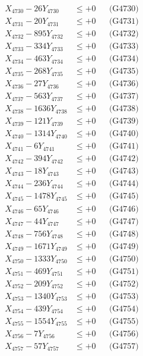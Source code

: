 \documentclass[a4paper,10pt]{article}
\begin{document}
{\begin{align}
X_{4730} - 26Y_{4730} &\leq +0 && \text{(G4730)} \\
\allowbreak
X_{4731} - 20Y_{4731} &\leq +0 && \text{(G4731)} \\
X_{4732} - 895Y_{4732} &\leq +0 && \text{(G4732)} \\
X_{4733} - 334Y_{4733} &\leq +0 && \text{(G4733)} \\
X_{4734} - 463Y_{4734} &\leq +0 && \text{(G4734)} \\
X_{4735} - 268Y_{4735} &\leq +0 && \text{(G4735)} \\
X_{4736} - 27Y_{4736} &\leq +0 && \text{(G4736)} \\
X_{4737} - 563Y_{4737} &\leq +0 && \text{(G4737)} \\
X_{4738} - 1636Y_{4738} &\leq +0 && \text{(G4738)} \\
X_{4739} - 121Y_{4739} &\leq +0 && \text{(G4739)} \\
X_{4740} - 1314Y_{4740} &\leq +0 && \text{(G4740)} \\
\allowbreak
X_{4741} - 6Y_{4741} &\leq +0 && \text{(G4741)} \\
X_{4742} - 394Y_{4742} &\leq +0 && \text{(G4742)} \\
X_{4743} - 18Y_{4743} &\leq +0 && \text{(G4743)} \\
X_{4744} - 236Y_{4744} &\leq +0 && \text{(G4744)} \\
X_{4745} - 1478Y_{4745} &\leq +0 && \text{(G4745)} \\
X_{4746} - 65Y_{4746} &\leq +0 && \text{(G4746)} \\
X_{4747} - 44Y_{4747} &\leq +0 && \text{(G4747)} \\
X_{4748} - 756Y_{4748} &\leq +0 && \text{(G4748)} \\
X_{4749} - 1671Y_{4749} &\leq +0 && \text{(G4749)} \\
X_{4750} - 1333Y_{4750} &\leq +0 && \text{(G4750)} \\
\allowbreak
X_{4751} - 469Y_{4751} &\leq +0 && \text{(G4751)} \\
X_{4752} - 209Y_{4752} &\leq +0 && \text{(G4752)} \\
X_{4753} - 1340Y_{4753} &\leq +0 && \text{(G4753)} \\
X_{4754} - 439Y_{4754} &\leq +0 && \text{(G4754)} \\
X_{4755} - 1554Y_{4755} &\leq +0 && \text{(G4755)} \\
X_{4756} - 7Y_{4756} &\leq +0 && \text{(G4756)} \\
X_{4757} - 57Y_{4757} &\leq +0 && \text{(G4757)} \\

\end{align}}
\end{document}
